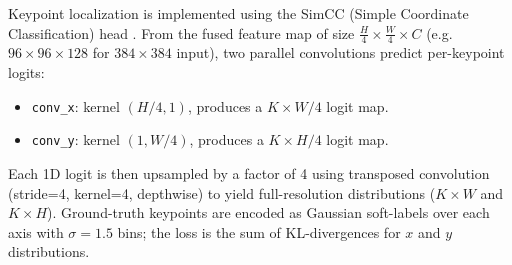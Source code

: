 Keypoint localization is implemented using the SimCC (Simple Coordinate Classification) head \cite{Li2022SimCC}. From the fused feature map of size $\frac{H}{4}\times\frac{W}{4}\times C$ (e.g.\ $96\times96\times128$ for $384\times384$ input), two parallel convolutions predict per-keypoint logits:
\begin{itemize}
  \item \texttt{conv\_x}: kernel $(H/4,1)$, produces a $K\times W/4$ logit map.
  \item \texttt{conv\_y}: kernel $(1,W/4)$, produces a $K\times H/4$ logit map.
\end{itemize}
Each 1D logit is then upsampled by a factor of 4 using transposed convolution (stride=4, kernel=4, depthwise) to yield full-resolution distributions ($K\times W$ and $K\times H$). Ground-truth keypoints are encoded as Gaussian soft-labels over each axis with $\sigma=1.5$ bins; the loss is the sum of KL-divergences for $x$ and $y$ distributions.
